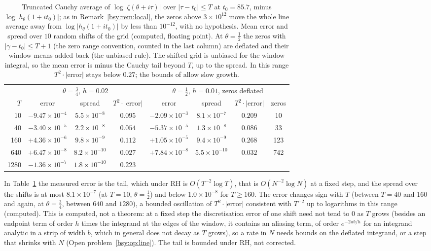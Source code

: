 \begin{table}[h]
\centering\footnotesize\setlength{\tabcolsep}{3pt}
\begin{tabular}{rccccccc}
\toprule
 & \multicolumn{3}{c}{$\theta=\frac34$, $h=0.02$} & \multicolumn{4}{c}{$\theta=\frac12$, $h=0.01$, zeros deflated}\\
$T$ & error & spread & $T^2\cdot|\mathrm{error}|$ & error & spread & $T^2\cdot|\mathrm{error}|$ & zeros\\
\midrule
10 & $-9.47\times10^{-4}$ & $5.5\times10^{-8}$ & $0.095$ & $-2.09\times10^{-3}$ & $8.1\times10^{-7}$ & $0.209$ & 10\\
40 & $-3.40\times10^{-5}$ & $2.2\times10^{-8}$ & $0.054$ & $-5.37\times10^{-5}$ & $1.3\times10^{-8}$ & $0.086$ & 33\\
160 & $+4.36\times10^{-6}$ & $9.8\times10^{-9}$ & $0.112$ & $+1.05\times10^{-5}$ & $9.4\times10^{-9}$ & $0.268$ & 123\\
640 & $+6.47\times10^{-8}$ & $8.2\times10^{-10}$ & $0.027$ & $+7.84\times10^{-8}$ & $5.5\times10^{-10}$ & $0.032$ & 742\\
1280 & $-1.36\times10^{-7}$ & $1.8\times10^{-10}$ & $0.223$ & & & & \\
\bottomrule
\end{tabular}
\caption{Truncated Cauchy average of $\log|\zeta(\theta+i\tau)|$ over $|\tau-t_0|\le T$ at $t_0=85.7$, minus $\log|h_\theta(1+it_0)|$; as in Remark~\ref{bsy:rem:local}, the zeros above $3\times10^{12}$ move the whole line average away from $\log|h_\theta(1+it_0)|$ by less than $10^{-12}$, with no hypothesis. Mean error and spread over $10$ random shifts of the grid (computed, floating point). At $\theta=\frac12$ the zeros with $|\gamma-t_0|\le T+1$ (the zero range convention, counted in the last column) are deflated and their window means added back (the unbiased rule). The shifted grid is unbiased for the window integral, so the mean error is minus the Cauchy tail beyond $T$, up to the spread. In this range $T^2\cdot|\mathrm{error}|$ stays below $0.27$; the bounds of \cite{BLM14} allow slow growth.}\label{bsy:tab:trunc}
\end{table}

In Table~\ref{bsy:tab:trunc} the measured error is the tail, which under RH is $O(T^{-2}\log T)$, that is $O(N^{-2}\log N)$ at a fixed step, and the spread over the shifts is at most $8.1\times10^{-7}$ (at $T=10$, $\theta=\frac12$) and below $1.0\times10^{-8}$ for $T\ge160$. The error changes sign with $T$ (between $T=40$ and $160$ and again, at $\theta=\frac34$, between $640$ and $1280$), a bounded oscillation of $T^2\cdot|\mathrm{error}|$ consistent with $T^{-2}$ up to logarithms in this range (computed). This is computed, not a theorem: at a fixed step the discretisation error of one shift need not tend to $0$ as $T$ grows (besides an endpoint term of order $h$ times the integrand at the edges of the window, it contains an aliasing term, of order $e^{-2\pi b/h}$ for an integrand analytic in a strip of width $b$, which in general does not decay as $T$ grows), so a rate in $N$ needs bounds on the deflated integrand, or a step that shrinks with $N$ (Open problem~\ref{bsy:op:line}). The tail is bounded under RH, not corrected.

